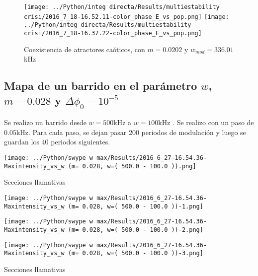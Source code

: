 	
	\begin{figure}[htp]
		\texttt{[image: ../Python/integ directa/Results/multiestability crisi/2016\_7\_18-16.52.11-color\_phase\_E\_vs\_pop.png]}
		\texttt{[image: ../Python/integ directa/Results/multiestability crisi/2016\_7\_18-16.37.22-color\_phase\_E\_vs\_pop.png]}
		\caption{Coexistencia de atractores caóticos, con $m=0.0202$ y $w_{mod}=336.01$kHz}
	\end{figure}
			
		\subsection{Mapa de un barrido en el parámetro $w$, $m=0.028$ y $\Delta \phi_0=10^{-5}$}			 
		
		Se realizo un barrido desde $w=500$kHz a $w=100$kHz . Se realizo con un paso de $0.05$kHz. Para cada paso, se dejan pasar 200 periodos de modulación y luego se guardan los 40 periodos siguientes.
		 
				\begin{center}
					\texttt{[image: ../Python/swype w max/Results/2016\_6\_27-16.54.36-Maxintensity\_vs\_w (m= 0.028, w=( 500.0 - 100.0 )).png]}
				\end{center}
					
				Secciones llamativas
				
				\begin{minipage}{0.33\textwidth}
					\centering
					\texttt{[image: ../Python/swype w max/Results/2016\_6\_27-16.54.36-Maxintensity\_vs\_w (m= 0.028, w=( 500.0 - 100.0 ))-1.png]}
				\end{minipage}
				\begin{minipage}{0.33\textwidth}
					\centering
					\texttt{[image: ../Python/swype w max/Results/2016\_6\_27-16.54.36-Maxintensity\_vs\_w (m= 0.028, w=( 500.0 - 100.0 ))-2.png]}
				\end{minipage}
				\begin{minipage}{0.33\textwidth}
					\centering
					\texttt{[image: ../Python/swype w max/Results/2016\_6\_27-16.54.36-Maxintensity\_vs\_w (m= 0.028, w=( 500.0 - 100.0 ))-3.png]}
				\end{minipage}
				
					
				Secciones llamativas
								
